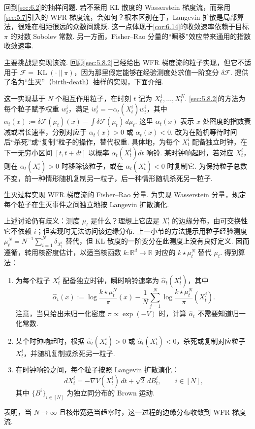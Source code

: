 回到\autoref{sec:6.2}的抽样问题. 若不采用 KL 散度的 Wasserstein 梯度流，而采用\autoref{sec:5.7}引入的 WFR 梯度流，会如何？根本区别在于，Langevin 扩散是局部算法，很难在相距很远的众数间跳跃. 这一点体现于\autoref{cor:6.14}的收敛速率依赖于目标 $\pi$ 的对数 Sobolev 常数. 另一方面，Fisher--Rao 分量的“瞬移”效应带来通用的指数收敛速率\cite{ref115}.

主要挑战是实现该流. 回顾\autoref{sec:5.8.2}已经给出 WFR 梯度流的粒子实现，但它不适用于 $\mathcal F=\operatorname{KL}(\cdot\|\pi)$，因为那里假定能够在经验测度处求值一阶变分 $\delta\mathcal F$. \cite{ref216}提供了名为“生灭”（birth-death）抽样的实现，下面介绍.

这一实现基于 $N$ 个相互作用粒子，在时刻 $t$ 记为 $X_t^1,\ldots,X_t^N$. \autoref{sec:5.8.2}的方法为每个粒子赋予权重 $w_t^i$，满足 $\dot w_t^i=-\alpha_t(X_t^i)w_t^i$，其中 $\alpha_t(x):=\delta\mathcal F(\mu_t)(x)-\int\delta\mathcal F(\mu_t)\,d\mu_t$. 这里 $\alpha_t(x)$ 表示 $x$ 处密度的指数衰减或增长速率，分别对应于 $\alpha_t(x)>0$ 或 $\alpha_t(x)<0$. 改为在随机等待时间后“杀死”或“复制”粒子的操作，替代权重. 具体地，为每个 $X_t^i$ 配备独立时钟，在下一无穷小区间 $[t,t+dt]$ 以概率 $\alpha_t(X_t^i)dt$ 响铃. 某时钟响起时，若对应 $X_t^i$，则在 $\alpha_t(X_t^i)>0$ 时移除该粒子，或在 $\alpha_t(X_t^i)<0$ 时复制它. 为保持粒子总数不变，前一种情形随机复制另一粒子，后一种情形随机杀死另一粒子.

生灭过程实现 WFR 梯度流的 Fisher--Rao 分量. 为实现 Wasserstein 分量，规定每个粒子在生灭事件之间独立地按 Langevin 扩散演化.

上述讨论仍有歧义：测度 $\mu_t$ 是什么？理想上它应是 $X_t^i$ 的边缘分布，由可交换性它不依赖 $i$；但实现时无法访问该边缘分布. 上一小节的方法提示用粒子经验测度 $\mu_t^N=N^{-1}\sum_{i=1}^N\delta_{X_t^i}$ 替代，但 KL 散度的一阶变分在此测度上没有良好定义. 因而遵循\cite{ref216}，转用核密度估计，以适当核函数 $k:\mathbb R^d\to\mathbb R$ 对应的 $k\star\mu_t^N$ 替代 $\mu_t$. 得到算法：
\begin{enumerate}
\item 为每个粒子 $X_t^i$ 配备独立时钟，瞬时响铃速率为 $\widehat\alpha_t(X_t^i)$，其中
$$
\widehat\alpha_t(x):=\log\frac{k\star\mu_t^N}\pi(x)
-\frac1N\sum_{j=1}^N\log\frac{k\star\mu_t^N}\pi(X_t^j).
$$
注意，当只给出未归一化密度 $\pi\propto\exp(-V)$ 时，计算 $\widehat\alpha_t$ 不需要知道归一化常数.
\item 某个时钟响起时，根据 $\widehat\alpha_t(X_t^i)>0$ 或 $\widehat\alpha_t(X_t^i)<0$，杀死或复制对应粒子 $X_t^i$，并随机复制或杀死另一粒子.
\item 在时钟响铃之间，每个粒子按照 Langevin 扩散演化：
$$
dX_t^i=-\nabla V(X_t^i)\,dt+\sqrt2\,dB_t^i,\qquad i\in[N],
$$
其中 $\{B^i\}_{i\in[N]}$ 为独立同分布的 Brown 运动.
\end{enumerate}
\cite{ref216}表明，当 $N\to\infty$ 且核带宽适当趋零时，这一过程的边缘分布收敛到 WFR 梯度流.
